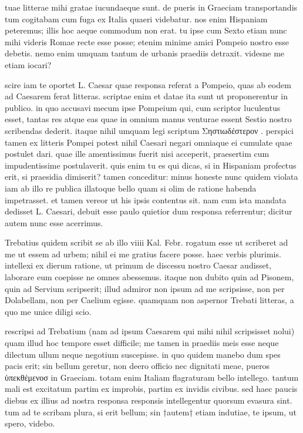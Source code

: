 


 tuae litterae mihi gratae iucundaeque sunt. de pueris in Graeciam transportandis tum cogitabam cum fuga ex Italia quaeri videbatur. nos enim Hispaniam peteremus; illis hoc aeque commodum non erat. tu ipse cum Sexto etiam nunc mihi videris Romae recte esse posse; etenim minime amici Pompeio nostro esse debetis. nemo enim umquam tantum de urbanis praediis detraxit. videsne me etiam iocari?

 scire iam te oportet L. Caesar quae responsa referat a Pompeio, quas ab eodem ad Caesarem ferat litteras. scriptae enim et datae ita sunt ut proponerentur in publico. in quo accusavi mecum ipse Pompeium qui, cum scriptor luculentus esset, tantas res atque eas quae in omnium manus venturae essent Sestio nostro scribendas dederit. itaque nihil umquam legi scriptum Σηστιωδέστερον . perspici tamen ex litteris Pompei potest nihil Caesari negari omniaque ei cumulate quae postulet dari. quae ille amentissimus fuerit nisi acceperit, praesertim cum impudentissime postulaverit. quis enim tu es qui dicas, si in Hispaniam profectus erit, si praesidia dimiserit? tamen conceditur: minus honeste nunc quidem violata iam ab illo re publica illatoque bello quam si olim de ratione habenda impetrasset. et tamen vereor ut his ipsis contentus sit. nam cum ista mandata dedisset L. Caesari, debuit esse paulo quietior dum responsa referrentur; dicitur autem nunc esse acerrimus.

 Trebatius quidem scribit se ab illo viiii Kal. Febr. rogatum esse ut scriberet ad me ut essem ad urbem; nihil ei me gratius facere posse. haec verbis plurimis. intellexi ex dierum ratione, ut primum de discessu nostro Caesar audisset, laborare eum coepisse ne omnes abessemus. itaque non dubito quin ad Pisonem, quin ad Servium scripserit; illud admiror non ipsum ad me scripsisse, non per Dolabellam, non per Caelium egisse. quamquam non aspernor Trebati litteras, a quo me unice diligi scio.

 rescripsi ad Trebatium (nam ad ipsum Caesarem qui mihi nihil scripsisset nolui) quam illud hoc tempore esset difficile; me tamen in praediis meis esse neque dilectum ullum neque negotium suscepisse. in quo quidem manebo dum spes pacis erit; sin bellum geretur, non deero officio nec dignitati meae, pueros ὑπεκθέμενοσ in Graeciam. totam enim Italiam flagraturam bello intellego. tantum mali est excitatum partim ex improbis, partim ex invidis civibus. sed haec paucis diebus ex illius ad nostra responsa responsis intellegentur quorsum evasura sint. tum ad te scribam plura, si erit bellum; sin †autem† etiam indutiae, te ipsum, ut spero, videbo.

